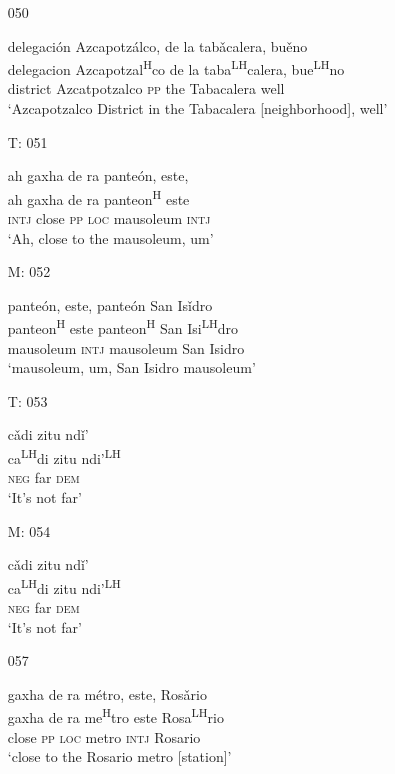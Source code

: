 \begin{itemize}
\item[050]
 
\glll   delegaci\'{o}n Azcapotz\'{a}lco, de la tab\v{a}calera, bu\v{e}no \\
delegacion Azcapotzal\textsuperscript{H}co de la taba\textsuperscript{LH}calera, bue\textsuperscript{LH}no \\
district Azcatpotzalco \textsc{pp} the Tabacalera well \\
\glt `Azcapotzalco District in the Tabacalera [neighborhood], well'
 



\item[T: 051]
 
\glll   ah gaxha de ra pante\'{o}n, este,  \\
ah gaxha de ra panteon\textsuperscript{H} este \\
\textsc{intj} close \textsc{pp} \textsc{loc} mausoleum \textsc{intj} \\
\glt `Ah, close to the mausoleum, um'
 

\item[M: 052]
 
\glll   pante\'{o}n, este, pante\'{o}n San Is\v{i}dro \\
panteon\textsuperscript{H} este panteon\textsuperscript{H} San Isi\textsuperscript{LH}dro \\
mausoleum \textsc{intj} mausoleum San Isidro \\
\glt `mausoleum, um, San Isidro mausoleum'
 


\item[T: 053]
 
\glll   c\v{a}di zitu nd\v{i}' \\
ca\textsuperscript{LH}di zitu ndi'\textsuperscript{LH} \\
\textsc{neg} far \textsc{dem} \\
\glt `It's not far'
 


\item[M: 054]
 
\glll   c\v{a}di zitu nd\v{i}' \\
ca\textsuperscript{LH}di zitu ndi'\textsuperscript{LH} \\
\textsc{neg} far \textsc{dem} \\
\glt `It's not far'
 


\item[057]
 
\glll   gaxha de ra m\'{e}tro, este, Ros\v{a}rio \\
gaxha de ra me\textsuperscript{H}tro este Rosa\textsuperscript{LH}rio \\
close \textsc{pp} \textsc{loc} metro \textsc{intj} Rosario \\
\glt `close to the Rosario metro [station]' 
 


\end{itemize}
